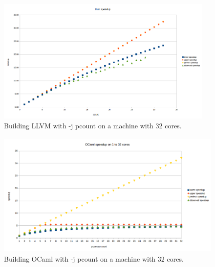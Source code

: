 \documentclass[10pt]{article}
\begin{document}





\begin{figure}[t]
  \centering
  \includegraphics[height=6.2cm]{llvm-speedup-chart.png}
  \caption{Building LLVM with -j pcount on a machine with 32 cores.}\label{fig:llvm}
\end{figure}

\begin{figure}[t]
  \centering
  \includegraphics[height=6.2cm]{ocaml-speedup-chart.png}
  \caption{Building OCaml with -j pcount on a machine with 32 cores.}\label{fig:ocaml}
\end{figure}
\end{document}
